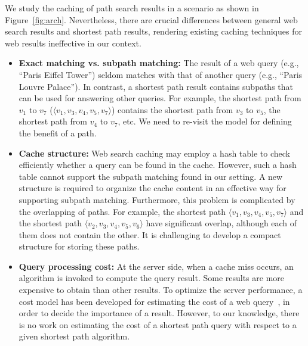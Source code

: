 \documentclass{sig-alternate}
\begin{document}
We study the caching of path search results in a scenario as shown in Figure~\ref{fig:arch}.
Nevertheless, there are crucial differences between general web search results and shortest path results,
rendering existing caching techniques for web results ineffective in our context.
\begin{itemize}
    \itemsep -2pt
    \item {\bf Exact matching vs. subpath matching:} The result of a web query (e.g., ``Paris Eiffel Tower'') seldom matches with that of another query (e.g., ``Paris Louvre Palace''). In contrast, a shortest path result contains subpaths that can be used for answering other queries. For example, the shortest path from $v_1$ to $v_7$ ($\langle v_1, v_3, v_4, v_5, v_7 \rangle$) contains the shortest path from $v_3$ to $v_5$, the shortest path from $v_4$ to $v_7$, etc. We need to re-visit the model for defining the benefit of a path.
    \item {\bf Cache structure:} Web search caching may employ a hash table to check efficiently whether a query can be found in the cache. However, such a hash table cannot support the subpath matching found in our setting. A new structure is required to organize the cache content in an effective way for supporting subpath matching.
        Furthermore, this problem is complicated by the overlapping of paths. For example, the shortest path $\langle v_1, v_3, v_4, v_5, v_7 \rangle$ and the shortest path $\langle v_2, v_3, v_4, v_5, v_6 \rangle$ have significant overlap, although each of them does not contain the other. It is challenging to develop a compact structure for storing these paths.
    \item {\bf Query processing cost:}
        At the server side, when a cache miss occurs, an algorithm is invoked to compute the query result.
        Some results are more expensive to obtain than other results.
        To optimize the server performance, a cost model has been developed for estimating the cost of a web query~\cite{AltingovdeOU09},
        in order to decide the importance of a result.
        However, to our knowledge, there is no work on estimating the cost of a shortest path query
        with respect to a given shortest path algorithm.
\end{itemize}
%
\end{document}
